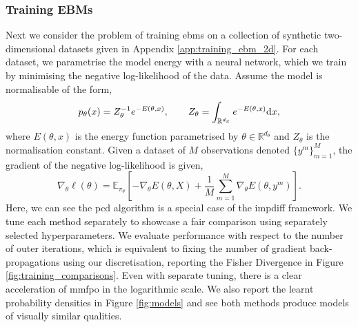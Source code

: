 \subsubsection{Training EBMs}\label{sec:ebm_training_2d}

Next we consider the problem of training \glspl*{ebm} on a collection of synthetic two-dimensional datasets given in Appendix \ref{app:training_ebm_2d}. For each dataset, we parametrise the model energy with a neural network, which we train by minimising the negative log-likelihood of the data. Assume the model is normalisable of the form,
\begin{equation*}
    p_\theta(x)=Z_\theta^{-1}e^{-E(\theta,x)},\qquad Z_\theta=\int_{\mathbb{R}^{d_x}}e^{-E(\theta,x)}\mathrm{d} x,
\end{equation*}
where $E(\theta,x)$ is the energy function parametrised by $\theta\in\mathbb{R}^{d_\theta}$ and $Z_\theta$ is the normalisation constant. Given a dataset of $M$ observations denoted $\{y^m\}_{m=1}^M$, the gradient of the negative log-likelihood is given,
\begin{equation*}
    \nabla_\theta\ell(\theta) = \mathbb{E}_{\pi_\theta}\left[-\nabla_\theta E(\theta,X)+\frac{1}{M}\sum_{m=1}^M\nabla_\theta E(\theta, y^m)\right].
\end{equation*}
Here, we can see the \gls*{pcd} algorithm is a special case of the \gls*{impdiff} framework. We tune each method separately to showcase a fair comparison using separately selected hyperparameters. We evaluate performance with respect to the number of outer iterations, which is equivalent to fixing the number of gradient back-propagations using our discretisation, reporting the Fisher Divergence in Figure \ref{fig:training_comparisons}. Even with separate tuning, there is a clear acceleration of \gls*{mmfpo} in the logarithmic scale. We also report the learnt probability densities in Figure \ref{fig:models} and see both methods produce models of visually similar qualities.